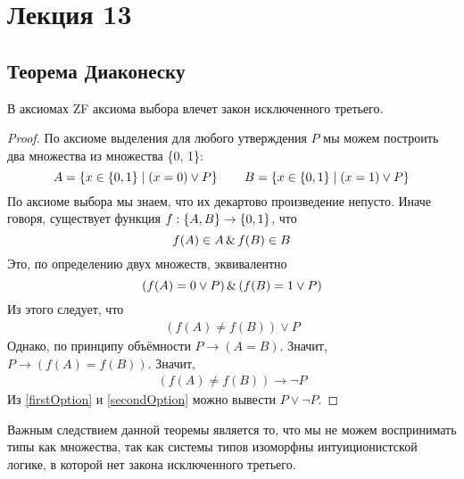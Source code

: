 \section{Лекция 13}

\subsection{Теорема Диаконеску}
\begin{theorem}[Диаконеску]
    В аксиомах ZF аксиома выбора влечет закон исключенного третьего.
\end{theorem}

\begin{proof}

По аксиоме выделения для любого утверждения $P$ мы можем построить два множества из множества \{0, 1\}:
\[
    A = \left\{x \in \left\{0, 1\right\} \mid \left(x = 0\right) \lor P\right\} \qquad
    B = \left\{x \in \left\{0, 1\right\} \mid \left(x = 1\right) \lor P\right\}
\]
По аксиоме выбора мы знаем, что их декартово произведение непусто.
Иначе говоря, существует функция $f : \left\{A, B\right\} \to \left\{0, 1\right\}$, что
\[
    f(A) \in A \operatorname{\&} f(B) \in B
\]
Это, по определению двух множеств, эквивалентно
\[
    \left(f(A) = 0 \vee P\right) \operatorname{\&} \left(f(B) = 1 \vee P\right)
\]
Из этого следует, что
\begin{gather}
    \left(f(A) \neq f(B)\right) \vee P \label{firstOption} \tag{$*$}
\end{gather}
Однако, по принципу объёмности $P \to \left(A=B\right)$. Значит, $P \to \left(f(A) = f(B)\right)$. Значит,
\begin{gather}
    \left(f(A) \neq f(B)\right) \to \neg P \label{secondOption} \tag{$**$}
\end{gather}
Из \ref{firstOption} и \ref{secondOption} можно вывести $P \vee \neg P$.

\end{proof}

Важным следствием данной теоремы является то, что мы не можем воспринимать типы как множества, так как системы типов изоморфны интуиционистской логике, в которой нет закона исключенного третьего.
